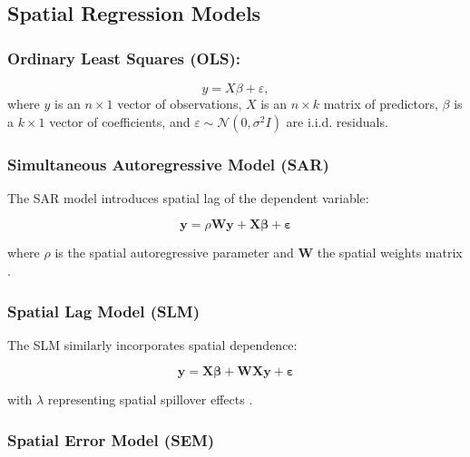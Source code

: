 \documentclass[a4paper,fleqn]{cas-sc}
\begin{document}
\subsection{Spatial Regression Models}

\vspace{0.5em}
\subsubsection{Ordinary Least Squares (OLS):}
\begin{equation}
    y = X\beta + \varepsilon,
\end{equation}
where \( y \) is an \( n \times 1 \) vector of observations, \( X \) is an \( n \times k \) matrix of predictors, \( \beta \) is a \( k \times 1 \) vector of coefficients, and \( \varepsilon \sim \mathcal{N}(0, \sigma^2 I) \) are i.i.d. residuals.


\vspace{0.5em}
\subsubsection{Simultaneous Autoregressive Model (SAR)}

The SAR model introduces spatial lag of the dependent variable:

\[
\mathbf{y} = \rho \mathbf{W} \mathbf{y} + \mathbf{X}\boldsymbol{\beta} + \boldsymbol{\varepsilon}
\]

where \( \rho \) is the spatial autoregressive parameter and \( \mathbf{W} \) the spatial weights matrix \citep{Aristizabal2024}.

\vspace{0.5em}
\subsubsection{Spatial Lag Model (SLM)}

The SLM similarly incorporates spatial dependence:

\[
\mathbf{y} = \mathbf{X}\boldsymbol{\beta} + \mathbf{W}\mathbf{X}\mathbf{y} + \boldsymbol{\varepsilon}
\]

with \( \lambda \) representing spatial spillover effects \citep{Aristizabal2024}.

\vspace{0.5em}
\subsubsection{Spatial Error Model (SEM)}
\end{document}
